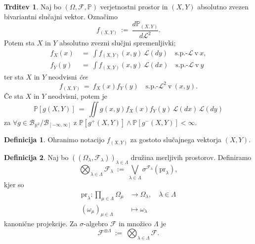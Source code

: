 \documentclass[11pt]{article}
\newcommand{\R}{\mathbb{R}}
\renewcommand{\P}{\mathbb{P}}
\newcommand{\F}{\mathcal{F}}
\newcommand{\B}{\mathscr{B}}
\newcommand{\LL}{\mathscr{L}}
\newcommand{\oklepaj}[1]{\left(#1\right)}
\newcommand{\1}{\mathbbm{1}}
\newcommand{\rr}{[-\infty,\infty]}
\newcommand{\pr}{\text{pr}}
\theoremstyle{definition}
\newtheorem{definicija}{Definicija}[section]
\theoremstyle{definition}
\newtheorem{trditev}{Trditev}[section]
\theoremstyle{definition}
\theoremstyle{definition}
\begin{document}
\begin{trditev}

Naj bo $(\Omega, \F, \P)$ verjetnostni prostor in $(X,Y)$ absolutno zvezen bivariantni slučajni vektor. Označimo
$$f_{(X,Y)} ~:=~ \frac{d\P_{(X,Y)}}{d\LL^2}.$$
Potem sta $X$ in $Y$ absolutno zvezni slučjni spremenljivki;
\begin{align*}
f_X(x) ~&=~ \int f_{(X,Y)}(x,y)\,\LL(dy) \quad \text{s.p.-}\LL ~\text{v}~x, \\
f_Y(y) ~&=~ \int f_{(X,Y)}(x,y)\,\LL(dx) \quad \text{s.p.-}\LL ~\text{v}~y
\end{align*}
ter sta $X$ in $Y$ neodvisni \textit{čee}
$$f_{(X,Y)} ~=~ f_X(x)f_Y(y) \quad \text{s.p.-}\LL^2 ~\text{v}~ (x,y).$$
Če sta $X$ in $Y$ neodvisni, potem je
$$\P[g(X,Y)] ~=~ \iint g(x,y) f_X(x) f_Y(y) \,\LL(dx)\,\LL(dy)$$
za $\forall g \in \B_{\R^2}/\B_{\rr}$ z $\P[g^+(X,Y)] \wedge \P[g^-(X,Y)] < \infty$.

\end{trditev}
\vspace{0.5cm}

\begin{definicija}

Ohranimo notacijo $f_{(X,Y)}$ za gostoto slučajnega vektorja $(X,Y)$.

\end{definicija}
\vspace{0.5cm}

\begin{definicija}

Naj bo $\oklepaj{(\Omega_\lambda, \F_\lambda)}_{\lambda\in\Lambda}$ družina merljivih prostorov. Definiramo
$$\bigotimes_{\lambda\in\Lambda} \F_\lambda ~:=~ \bigvee_{\lambda \in \Lambda} \sigma^{\F_\lambda}(\pr_\lambda),$$
kjer so 
\begin{align*}
\pr_\lambda: \prod_{\mu \in \Lambda} \Omega_\mu &\rightarrow \Omega_\lambda, \quad \lambda \in \Lambda \\
(\omega_\mu)_{\mu \in \Lambda} &\mapsto \omega_\lambda
\end{align*}
kanonične projekcije. Za $\sigma$-algebro $\F$ in množico $\Lambda$ je 
$$\F^{\otimes\Lambda} ~:=~ \bigotimes_{\lambda\in\Lambda} \F.$$

\end{definicija}
\vspace{0.5cm}
\end{document}
